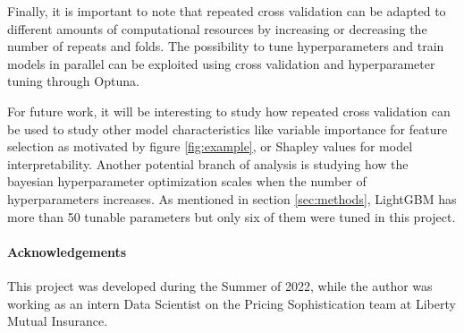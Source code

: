 \documentclass[11pt,a4paper]{article}
\theoremstyle{plain}
\theoremstyle{definition}
\begin{document}
Finally, it is important to note that repeated cross validation can be adapted to different amounts of computational resources by increasing or decreasing the number of repeats and folds. The possibility to tune hyperparameters and train models in parallel can be exploited using cross validation and hyperparameter tuning through Optuna.

For future work, it will be interesting to study how repeated cross validation can be used to study other model characteristics like variable importance for feature selection as motivated by figure \ref{fig:example}, or Shapley values for model interpretability. Another potential branch of analysis is studying how the bayesian hyperparameter optimization scales when the number of hyperparameters increases. As mentioned in section \ref{sec:methods}, LightGBM has more than 50 tunable parameters but only six of them were tuned in this project.
	
\paragraph{Acknowledgements} This project was developed during the Summer of 2022, while the author was working as an intern Data Scientist on the Pricing Sophistication team at Liberty Mutual Insurance.

\newpage


\end{document}
